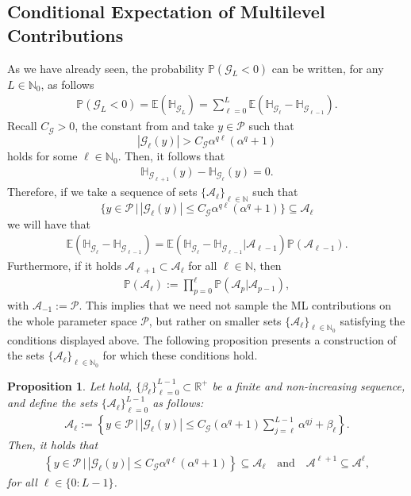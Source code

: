 \documentclass{article}
\newtheorem{proposition}[theorem]{Proposition}
\newcommand{\cA}{\mathcal{A}}
\newcommand{\cG}{\mathcal{G}}
\newcommand{\cP}{\mathcal{P}}
\newcommand{\IE}{\mathbb{E}}
\newcommand{\IH}{\mathbb{H}}
\newcommand{\IN}{\mathbb{N}}
\newcommand{\IP}{\mathbb{P}}
\newcommand{\IR}{\mathbb{R}}
\newcommand{\abs}[1]{{\left\vert #1 \right\vert}}
\theoremstyle{definition}
\begin{document}
\subsection{Conditional Expectation of Multilevel Contributions}
\label{sec:MLMLIPS}
As we have already seen, the probability $\IP(\cG_L < 0)$ can be written, for any $L\in\IN_0$, as follows
\begin{align*}
  \IP(\cG_L < 0) = \IE(\IH_{\cG_L})=\sum\limits_{\ell=0}^{L}\IE(\IH_{\cG_\ell}-\IH_{\cG_{\ell-1}}).
\end{align*}
Recall $C_{\cG}>0$, the constant from  and take $y\in\cP$ such that
$$\abs{\cG_{\ell}(y)}>C_{\cG}\alpha^{q\ell}(\alpha^{q}+1)$$
holds for some $\ell\in\IN_0$. Then, it follows that
\begin{align}\label{eq:integrand0}\IH_{\cG_{\ell+1}}(y)-\IH_{\cG_{\ell}}(y) = 0.\end{align}
Therefore, if we take a sequence of sets $\{\cA_\ell\}_{\ell\in\IN}$ such that
$$\{y\in\cP\,\vert\,\abs{\cG_\ell(y)}\leq C_\cG\alpha^{q\ell}(\alpha^q+1)\}\subseteq \cA_\ell$$
we will have that
\begin{align}
  \label{eq:expcond}
  \IE(\IH_{\cG_\ell}-\IH_{\cG_{\ell-1}})=\IE(\IH_{\cG_\ell}-\IH_{\cG_{\ell-1}}\vert \cA_{\ell-1})\IP(\cA_{\ell-1}).
\end{align}
Furthermore, if it holds $\cA_{\ell+1}\subset\cA_{\ell}$ for all $\ell\in\IN$, then
\begin{align}
  \label{eq:subsetsim}
  \IP(\cA_\ell):=\prod_{p=0}^\ell\IP(\cA_p\vert\cA_{p-1}),
\end{align}
with $\cA_{-1}:=\cP$. This implies that we need not sample the ML contributions on the whole parameter space $\cP$,
but rather on smaller sets $\{\cA_\ell\}_{\ell\in\IN_0}$ satisfying the conditions displayed above. The following
proposition presents a construction of the sets $\{\cA_\ell\}_{\ell\in\IN_0}$ for which these conditions hold.
\begin{proposition}
  \label{prop:setdefi}
  Let  hold, $\{\beta_\ell\}_{\ell=0}^{L-1}\subset\IR^+$ be a finite and non-increasing sequence, and
  define the sets $\{\cA_\ell\}_{\ell=0}^{L-1}$ as follows:
  \begin{align*}
    \cA_\ell:=\left\lbrace y\in\cP\,\Bigg\vert\,\abs{\cG_\ell(y)}\leq C_\cG(\alpha^q+1)\sum\limits_{j=\ell}^{L-1}\alpha^{q j}+\beta_\ell\right\rbrace.
  \end{align*}
  Then, it holds that
  \begin{align*}
    \left\{y\in\cP\,\vert\,\abs{\cG_\ell(y)}\leq C_\cG\alpha^{q\ell}(\alpha^q+1)\right\}\subseteq\cA_\ell\quad\text{and}\quad\cA^{\ell+1}\subseteq\cA^{\ell},
  \end{align*}
  for all $\ell\in\{0:L-1\}$.
\end{proposition}
\end{document}
